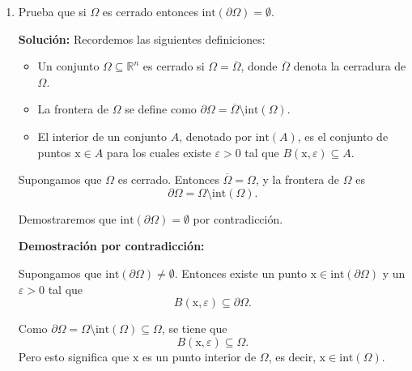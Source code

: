 \documentclass[12pt]{article}
\newcommand{\Int}{\mathrm{int}}
\newcommand{\N}{\mathbb N}
\newcommand{\R}{\mathbb R}
\newcommand{\x}{\mathrm x}
\begin{document}
\begin{enumerate}
\begin{itemize}
    Para cada $k \in \N$, definimos
    \[
    (x_k, y_k) = \left(x_0 + \frac{1}{k}, y_0\right).
    \]
    Observamos que
    \[
    x_k = x_0 + \frac{1}{k} = y_0^2 + \frac{1}{k} > y_0^2 = y_k^2,
    \]
    por lo que $(x_k, y_k) \in \Omega$ para toda $k \in \N$. Además,
    \[
    \lim_{k \to \infty} (x_k, y_k) = \lim_{k \to \infty} \left(x_0 + \frac{1}{k}, y_0\right) = (x_0, y_0).
    \]
    Por lo tanto, $(x_0, y_0)$ es un punto de acumulación de $\Omega$, y así $(x_0, y_0) \in \overline{\Omega}$.
\end{itemize}

En ambos casos, $(x_0, y_0) \in \overline{\Omega}$, lo que demuestra que
\[
\{ (x,y)\in \R^2 : x \geq y^2 \} \subseteq \overline{\Omega}.
\]

Combinando ambas contenciones, concluimos que
\[
\overline{\Omega} = \{ (x,y)\in \R^2 : x \geq y^2 \}.
\]

\item Prueba que si $\Omega$ es cerrado entonces 
$\Int(\partial \Omega)=\emptyset$.

\textbf{Solución: } Recordemos las siguientes definiciones:
\begin{itemize}
    \item Un conjunto $\Omega \subseteq \R^n$ es cerrado si $\Omega = \overline{\Omega}$, donde $\overline{\Omega}$ denota la cerradura de $\Omega$.
    \item La frontera de $\Omega$ se define como $\partial \Omega = \overline{\Omega} \setminus \Int(\Omega)$.
    \item El interior de un conjunto $A$, denotado por $\Int(A)$, es el conjunto de puntos $\x \in A$ para los cuales existe $\varepsilon > 0$ tal que $B(\x, \varepsilon) \subseteq A$.
\end{itemize}

Supongamos que $\Omega$ es cerrado. Entonces $\overline{\Omega} = \Omega$, y la frontera de $\Omega$ es
\[
\partial \Omega = \Omega \setminus \Int(\Omega).
\]

Demostraremos que $\Int(\partial \Omega) = \emptyset$ por contradicción.

\textbf{Demostración por contradicción:}

Supongamos que $\Int(\partial \Omega) \neq \emptyset$. Entonces existe un punto $\x \in \Int(\partial \Omega)$ y un $\varepsilon > 0$ tal que
\[
B(\x, \varepsilon) \subseteq \partial \Omega.
\]

Como $\partial \Omega = \Omega \setminus \Int(\Omega) \subseteq \Omega$, se tiene que
\[
B(\x, \varepsilon) \subseteq \Omega.
\]
Pero esto significa que $\x$ es un punto interior de $\Omega$, es decir, $\x \in \Int(\Omega)$.


\end{enumerate}
\end{document}

